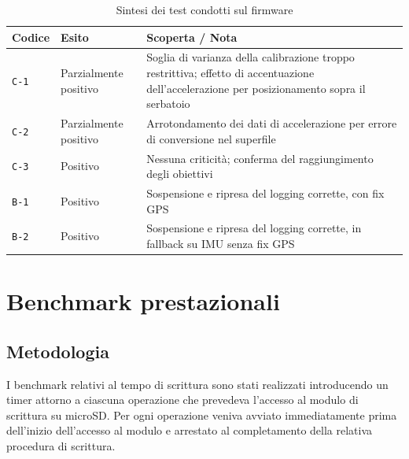 \begin{table}[H]
    \centering
    \begin{tabular}{p{2.0cm} p{2.8cm} p{8cm}}
        \hline
        \textbf{Codice} &
        \textbf{Esito} &
        \textbf{Scoperta / Nota} \\
        \hline

        \texttt{C-1} &
        Parzialmente positivo &
        Soglia di varianza della calibrazione troppo restrittiva; effetto di accentuazione
        dell'accelerazione per posizionamento sopra il serbatoio \\

        \texttt{C-2} &
        Parzialmente positivo &
        Arrotondamento dei dati di accelerazione per errore di conversione
        nel superfile \\

        \texttt{C-3} &
        Positivo &
        Nessuna criticità; conferma del raggiungimento degli obiettivi \\

        \texttt{B-1} &
        Positivo &
        Sospensione e ripresa del logging corrette, con fix GPS \\

        \texttt{B-2} &
        Positivo &
        Sospensione e ripresa del logging corrette, in fallback su IMU senza
        fix GPS \\

        \hline
    \end{tabular}
    \caption{Sintesi dei test condotti sul firmware}
    \label{tab:sintesi_test}
\end{table}

\newpage

\section{Benchmark prestazionali}
\label{sec:benchmark_prestazionali}

\subsection{Metodologia}
\label{subsec:metodologia_benchmark}

I benchmark relativi al tempo di scrittura sono stati realizzati introducendo un timer 
attorno a ciascuna operazione che
prevedeva l'accesso al modulo di scrittura su microSD. Per ogni operazione veniva
avviato immediatamente prima dell'inizio dell'accesso al modulo e
arrestato al completamento della relativa procedura di scrittura.

